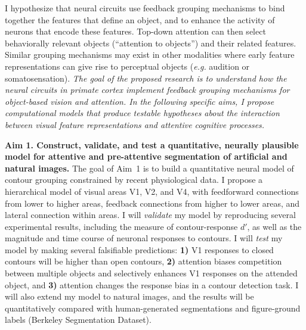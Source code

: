 \documentclass[11pt,notitlepage]{article}
\newcommand{\eg}[0]{{\em e.g.}\xspace}
\begin{document}
I hypothesize 
that neural circuits
use feedback grouping mechanisms to bind together the features that define an
object, and to enhance the activity of neurons that encode these
features.
Top-down attention can then select
behaviorally relevant objects (``attention to objects'')
and their related features.
Similar grouping
mechanisms may exist in other modalities where early feature
representations can give rise to perceptual objects (\eg audition or
somatosensation).
%
 {\em The goal of the proposed research is to
  understand how the neural circuits in primate cortex implement
  feedback grouping mechanisms for
  object-based vision and attention. In the following specific aims, I
  propose computational models that produce testable hypotheses about
  the interaction between visual feature representations and attentive
  cognitive processes.}

\bigskip

\textbf{\large Aim 1. Construct, validate, and test a quantitative,
  neurally plausible model for attentive and pre-attentive
  segmentation of artificial and natural images.} The goal of Aim~1 is
to build a quantitative neural model of contour grouping constrained
by recent physiological data. I propose a hierarchical model of visual
areas V1, V2, and V4, with feedforward connections from lower to
higher areas, feedback connections from higher to lower areas, and
lateral connection within areas. I will {\em validate} my model by
reproducing several experimental results, including the measure of
contour-response $d'$, as well as the magnitude and time course of
neuronal responses to contours. I will {\em test} my model by making
several falsifiable predictions: \textbf{1)} V1 responses to closed
contours will be higher than open contours, \textbf{2)} attention
biases competition between multiple objects and selectively enhances
V1 responses on the attended object, and \textbf{3)} attention changes
the response bias in a contour detection task.  I will also extend my
model to natural images, and the results will be quantitatively
compared with human-generated segmentations and figure-ground labels
(Berkeley Segmentation Dataset).
\end{document}
